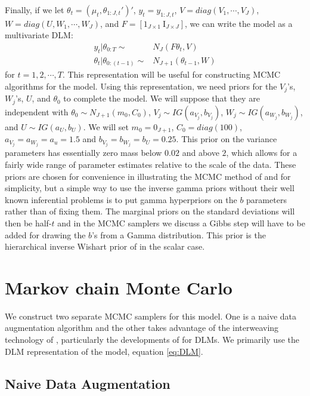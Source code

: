 \documentclass[graybox]{svmult}
\begin{document}
Finally, if we let $\theta_t=(\mu_t,\theta_{1:J,t}')'$, $y_t=y_{1:J,t}$, $V=diag(V_1,\cdots,V_J)$, $W=diag(U,W_1,\cdots,W_J)$, and $F=[1_{J\times 1}\  \mathrm{I}_{J\times J}]$, we can write the model as a multivariate DLM:
\begin{align}
y_t|\theta_{0:T}\sim&N_J(F\theta_t,V)\nonumber\\
\theta_t|\theta_{0:(t-1)}\sim&N_{J+1}(\theta_{t-1},W)\label{eq:DLM}
\end{align}
for $t=1,2,\cdots,T$. This representation will be useful for constructing MCMC algorithms for the model. Using this representation, we need priors for the $V_j$'s, $W_j$'s, $U$, and $\theta_0$ to complete the model. We will suppose that they are independent with $\theta_0\sim N_{J+1}(m_0,C_0)$, $V_j\sim IG(a_{V_j},b_{V_j})$, $W_j\sim IG(a_{W_j},b_{W_j})$, and $U\sim IG(a_U,b_U)$. We will set $m_0=0_{J+1}$, $C_0=diag(100)$, $a_{V_j}=a_{W_j}=a_u=1.5$ and $b_{V_j}=b_{W_j}=b_U=0.25$. This prior on the variance parameters has essentially zero mass below $0.02$ and above $2$, which allows for a fairly wide range of parameter estimates relative to the scale of the data. These priors are chosen for convenience in illustrating the MCMC method of \citet{simpson2014interweaving} and for simplicity, but a simple way to use the inverse gamma priors without their well known inferential problems \citep{gelman2006prior} is to put gamma hyperpriors on the $b$ parameters rather than of fixing them. The marginal priors on the standard deviations will then be half-$t$ and in the MCMC samplers we discuss a Gibbs step will have to be added for drawing the $b$'s from a Gamma distribution. This prior is the hierarchical inverse Wishart prior of \citet{huang2013simple} in the scalar case.


\section{Markov chain Monte Carlo}\label{sec:MCMC}
We construct two separate MCMC samplers for this model. One is a naive data augmentation algorithm and the other takes advantage of the interweaving technology of \citet{yu2011center}, particularly the developments of \citet{simpson2014interweaving} for DLMs. We primarily use the DLM representation of the model, equation \eqref{eq:DLM}. 

\subsection{Naive Data Augmentation}\label{sec:gibbs}
\end{document}

